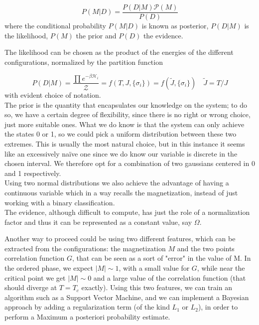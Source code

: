 \documentclass[a4paper,11pt]{article}
\begin{document}
\begin{equation}
     P(M|D) = \frac{P(D|M)\mathcal{P}(M)}{P(D)}
\end{equation}
where the conditional probability $P(M|D)$ is known as posterior, $P(D|M)$ is the likelihood, $P(M)$ the prior and $P(D)$ the evidence.

The likelihood can be chosen as the product of the energies of the different configurations, normalized by the partition function

\begin{equation}
    P(D|M) = \frac{\prod e^{-\beta \mathcal{H}_i}}{\mathcal{Z}} = f(T, J, \{\sigma_i\}) = f(\tilde{J}, \{\sigma_i\}) \quad \tilde{J} = T/J 
\end{equation}
with evident choice of notation.
\\
The prior is the quantity that encapsulates our knowledge on the system; to do so, we have a certain degree of flexibility, since there is no right or wrong choice, just more suitable ones. What we do know is that the system can only achieve the states 0 or 1, so we could pick a uniform distribution between these two extremes. This is usually the most natural choice, but in this instance it seems like an excessively naïve one since we do know our variable is discrete in the chosen interval. We therefore opt for a combination of two gaussians centered in 0 and 1 respectively.
\\
Using two normal distributions we also achieve the advantage of having a continuous variable which in a way recalls the magnetization, instead of just working with a binary classification.
\\
The evidence, although difficult to compute, has just the role of a normalization factor and thus it can be represented as a constant value, say $\Omega$.

Another way to proceed could be using two different features, which can be extracted from the configurations: the magnetization $M$ and the two points correlation function $G$, that can be seen as a sort of "error" in the value of M. In the ordered phase, we expect $|M| \sim 1$, with a small value for $G$, while near the critical point we get $|M| \sim 0$ and a large value of the correlation function (that should diverge at $T=T_c$ exactly). Using this two features, we can train an algorithm such as a Support Vector Machine, and we can implement a Bayesian approach by adding a regularization term (of the kind $L_1$ or $L_2$), in order to perform a Maximum a posteriori probability estimate.
\end{document}
